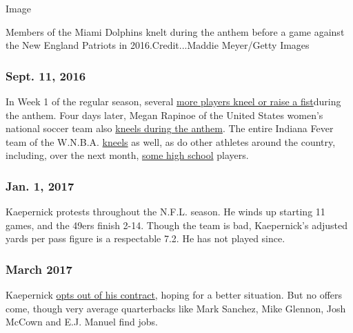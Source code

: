 Image

Members of the Miami Dolphins knelt during the anthem before a game
against the New England Patriots in 2016.Credit...Maddie Meyer/Getty
Images

\hypertarget{sept-11-2016}{%
\subsubsection{\texorpdfstring{\textbf{Sept. 11,
2016}}{Sept. 11, 2016}}\label{sept-11-2016}}

In Week 1 of the regular season, several
\href{https://www.nytimes.com/2016/09/13/sports/colin-kaepernick-athlete-protests.html}{more
players kneel or raise a fist}during the anthem. Four days later, Megan
Rapinoe of the United States women's national soccer team also
\href{https://www.nytimes.com/2016/09/17/sports/soccer/megan-rapinoe-in-an-american-uniform-kneels-for-the-anthem.html}{kneels
during the anthem}. The entire Indiana Fever team of the W.N.B.A.
\href{https://www.nytimes.com/2016/09/22/sports/basketball/indiana-fever-kneel-national-anthem-colin-kaepernick-cam-newton.html}{kneels}
as well, as do other athletes around the country, including, over the
next month,
\href{https://www.nytimes.com/2016/10/04/us/national-anthem-protests-high-schools.html}{some
high school} players.

\hypertarget{jan-1-2017}{%
\subsubsection{\texorpdfstring{\textbf{Jan. 1,
2017}}{Jan. 1, 2017}}\label{jan-1-2017}}

Kaepernick protests throughout the N.F.L. season. He winds up starting
11 games, and the 49ers finish 2-14. Though the team is bad,
Kaepernick's adjusted yards per pass figure is a respectable 7.2. He has
not played since.

\hypertarget{march-2017}{%
\subsubsection{\texorpdfstring{\textbf{March
2017}}{March 2017}}\label{march-2017}}

Kaepernick
\href{https://www.nytimes.com/2017/03/27/sports/football/free-agent-colin-kaepernick-national-anthem-protest.html}{opts
out of his contract}, hoping for a better situation. But no offers come,
though very average quarterbacks like Mark Sanchez, Mike Glennon, Josh
McCown and E.J. Manuel find jobs.

